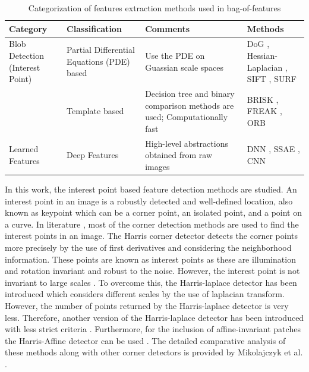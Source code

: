 \begin{table}
\renewcommand{\arraystretch}{1.5}
\centering
\caption[Categorization of features extraction methods used in bag-of-features]{\fontsize{10pt}{12pt}\selectfont Categorization of features extraction methods used in bag-of-features \cite{li2015}}
\label{ch2:Tab:features}
\footnotesize{
\begin{tabular}{p{2.8cm}|p{3.5cm}|p{4cm}|p{3.5cm}}
     \hline
    \textbf{Category}  & \textbf{Classification} &  \textbf{Comments} & \textbf{Methods}\\
     \hline 
    Blob Detection (Interest Point) &  Partial Differential Equations (PDE) based & Use the PDE on Guassian scale spaces &  DoG \cite{polakowski1997}, Hessian-Laplacian \cite{orting2018}, SIFT \cite{lowe2004}, SURF \cite{bay2008}\\

 & Template based & Decision tree and binary comparison methods are used; Computationally fast & BRISK \cite{leutenegger2011}, FREAK \cite{alahi2012}, ORB \cite{rublee2011}\\

Learned Features & Deep Features &  High-level abstractions obtained from raw images &DNN \cite{bar2015}, SSAE \cite{xu2014}, CNN \cite{cruz2013} \\
\hline
\end{tabular}
}
\end{table}
In this work, the interest point based feature detection methods are studied.
An interest point in an image is a robustly detected and well-defined location, also known as keypoint which can be a corner point, an isolated point, and a point on a curve. In literature \cite{durand2013}, most of the corner detection methods are used to find the interest points in an image.  The Harris corner detector \cite{harris1988} detects the corner points more precisely by the use of first derivatives and considering the neighborhood information.  These points are known as interest points as these are illumination and rotation invariant and robust to the noise. However, the interest point is not invariant to large scales \cite{schmid2000}. To overcome this,  the Harris-laplace detector \cite{mikolajczyk2002} has been introduced which considers different scales by the use of  laplacian transform. However, the number of points returned by the Harris-laplace detector is very less. Therefore, another version of the Harris-laplace detector has been introduced with less strict criteria \cite{mikolajczyk2005}. Furthermore, for the inclusion of affine-invariant patches the Harris-Affine detector can be used \cite{mikolajczyk2004}. The detailed comparative analysis of these methods along with other corner detectors is provided by Mikolajczyk et al. \cite{mikolajczyk2005}. 

